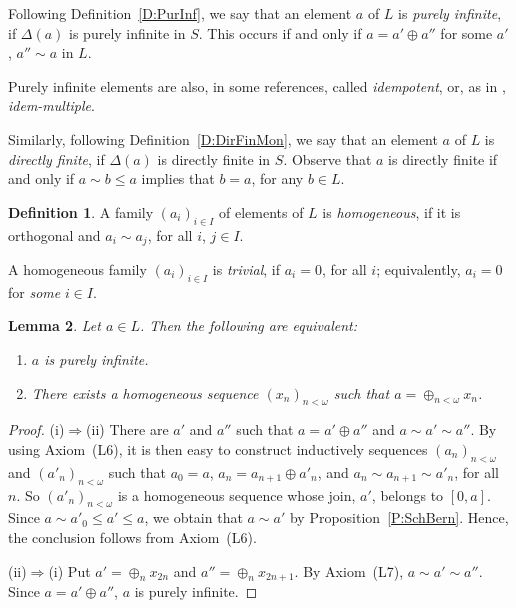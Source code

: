 \documentclass[psamsfonts,reqno]{memo-l}
\theoremstyle{plain}
\newtheorem{lemma}{Lemma}[section]
\theoremstyle{definition}
\newtheorem{definition}[lemma]{Definition}
\theoremstyle{remark}
\numberwithin{equation}{section}
\newcommand{\DD}{\Delta}
\newcommand{\famm}[2]{(#1)_{#2}}
\begin{document}
Following Definition~\ref{D:PurInf}, we say that an element $a$ of $L$ is
\emph{purely infinite},
if $\DD(a)$ is purely infinite in $S$. This occurs
if and only if $a=a'\oplus a''$ for some $a'$, $a''\sim a$ in $L$.

Purely infinite elements are also, in some references, called
\emph{idempotent}, or, as in \cite{Tars},
\emph{idem-multiple}.

Similarly, following Definition~\ref{D:DirFinMon}, we say that an element
$a$ of $L$ is \emph{directly finite}, if $\DD(a)$ is
directly finite in $S$. Observe that $a$ is directly
finite if and only if
$a\sim b\leq a$ implies that $b=a$, for any $b\in L$.

\begin{definition}\label{D:HomogSeq}
A family $\famm{a_i}{i\in I}$ of elements of $L$
is \emph{homogeneous}, if it is orthogonal and
$a_i\sim a_j$, for all $i$, $j\in I$.

A homogeneous family $\famm{a_i}{i\in I}$ is \emph{trivial}, if $a_i=0$, for
all $i$; equivalently, $a_i=0$ for \emph{some} $i\in I$.
\end{definition}
\begin{lemma}\label{L:CharPurInf}
Let $a\in L$. Then the following are equivalent:
\begin{enumerate}
\item $a$ is purely infinite.

\item There exists a homogeneous sequence $\famm{x_n}{n<\omega}$ such that
$a=\oplus_{n<\omega}x_n$.

\end{enumerate}
\end{lemma}

\begin{proof}
(i)$\Rightarrow$(ii) There are $a'$ and $a''$ such that $a=a'\oplus a''$
and $a\sim a'\sim a''$.
By using Axiom~(L6), it is then easy to construct inductively sequences
$\famm{a_n}{n<\omega}$ and $\famm{a'_n}{n<\omega}$ such that
$a_0=a$, $a_n=a_{n+1}\oplus a'_n$, and $a_n\sim a_{n+1}\sim a'_n$,
for all $n$. So $\famm{a'_n}{n<\omega}$ is a homogeneous sequence whose
join, $a'$, belongs to $[0,a]$. Since $a\sim a'_0\leq a'\leq a$, we obtain
that $a\sim a'$ by Proposition~\ref{P:SchBern}.
Hence, the conclusion follows from Axiom~(L6).

(ii)$\Rightarrow$(i) Put $a'=\oplus_nx_{2n}$ and $a''=\oplus_nx_{2n+1}$. By
Axiom~(L7), $a\sim a'\sim a''$. Since $a=a'\oplus a''$, $a$ is purely
infinite.
\end{proof}
\end{document}
